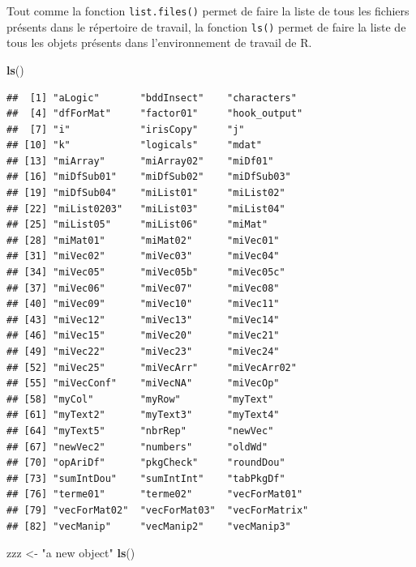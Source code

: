 \documentclass[twoside,symmetric]{book}
\newenvironment{Shaded}{}{}
\newcommand{\KeywordTok}[1]{\textbf{#1}}
\newcommand{\NormalTok}[1]{#1}
\newcommand{\StringTok}[1]{#1}
\begin{document}
Tout comme la fonction \texttt{list.files()} permet de faire la liste de tous les fichiers présents dans le répertoire de travail, la fonction \texttt{ls()} permet de faire la liste de tous les objets présents dans l'environnement de travail de R.

\begin{Shaded}
\begin{Highlighting}[]
\KeywordTok{ls}\NormalTok{()}
\end{Highlighting}
\end{Shaded}

\begin{verbatim}
##  [1] "aLogic"       "bddInsect"    "characters"  
##  [4] "dfForMat"     "factor01"     "hook_output" 
##  [7] "i"            "irisCopy"     "j"           
## [10] "k"            "logicals"     "mdat"        
## [13] "miArray"      "miArray02"    "miDf01"      
## [16] "miDfSub01"    "miDfSub02"    "miDfSub03"   
## [19] "miDfSub04"    "miList01"     "miList02"    
## [22] "miList0203"   "miList03"     "miList04"    
## [25] "miList05"     "miList06"     "miMat"       
## [28] "miMat01"      "miMat02"      "miVec01"     
## [31] "miVec02"      "miVec03"      "miVec04"     
## [34] "miVec05"      "miVec05b"     "miVec05c"    
## [37] "miVec06"      "miVec07"      "miVec08"     
## [40] "miVec09"      "miVec10"      "miVec11"     
## [43] "miVec12"      "miVec13"      "miVec14"     
## [46] "miVec15"      "miVec20"      "miVec21"     
## [49] "miVec22"      "miVec23"      "miVec24"     
## [52] "miVec25"      "miVecArr"     "miVecArr02"  
## [55] "miVecConf"    "miVecNA"      "miVecOp"     
## [58] "myCol"        "myRow"        "myText"      
## [61] "myText2"      "myText3"      "myText4"     
## [64] "myText5"      "nbrRep"       "newVec"      
## [67] "newVec2"      "numbers"      "oldWd"       
## [70] "opAriDf"      "pkgCheck"     "roundDou"    
## [73] "sumIntDou"    "sumIntInt"    "tabPkgDf"    
## [76] "terme01"      "terme02"      "vecForMat01" 
## [79] "vecForMat02"  "vecForMat03"  "vecForMatrix"
## [82] "vecManip"     "vecManip2"    "vecManip3"
\end{verbatim}

\begin{Shaded}
\begin{Highlighting}[]
\NormalTok{zzz <-}\StringTok{ "a new object"}
\KeywordTok{ls}\NormalTok{()}
\end{Highlighting}
\end{Shaded}
\end{document}
